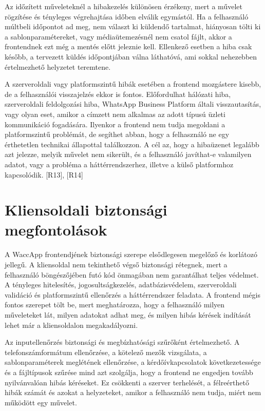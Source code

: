 Az időzített műveleteknél a hibakezelés különösen érzékeny, mert a művelet rögzítése és tényleges végrehajtása időben elválik egymástól. Ha a felhasználó múltbeli időpontot ad meg, nem választ ki küldendő tartalmat, hiányosan tölti ki a sablonparamétereket, vagy médiaütemezésnél nem csatol fájlt, akkor a frontendnek ezt még a mentés előtt jeleznie kell. Ellenkező esetben a hiba csak később, a tervezett küldés időpontjában válna láthatóvá, ami sokkal nehezebben értelmezhető helyzetet teremtene. 

A szerveroldali vagy platformszintű hibák esetében a frontend mozgástere kisebb, de a felhasználói visszajelzés ekkor is fontos. Előfordulhat hálózati hiba, szerveroldali feldolgozási hiba, WhatsApp Business Platform általi visszautasítás, vagy olyan eset, amikor a címzett nem alkalmas az adott típusú üzleti kommunikáció fogadására. Ilyenkor a frontend nem tudja megoldani a platformszintű problémát, de segíthet abban, hogy a felhasználó ne egy érthetetlen technikai állapottal találkozzon. A cél az, hogy a hibaüzenet legalább azt jelezze, melyik művelet nem sikerült, és a felhasználó javíthat-e valamilyen adatot, vagy a probléma a háttérrendszerhez, illetve a külső platformhoz kapcsolódik. [R13], [R14] 

\section{Kliensoldali biztonsági megfontolások}

A WaccApp frontendjének biztonsági szerepe elsődlegesen megelőző és korlátozó jellegű. A kliensoldal nem tekinthető végső biztonsági rétegnek, mert a felhasználó böngészőjében futó kód önmagában nem garantálhat teljes védelmet. A tényleges hitelesítés, jogosultságkezelés, adatbázisvédelem, szerveroldali validáció és platformszintű ellenőrzés a háttérrendszer feladata. A frontend mégis fontos szerepet tölt be, mert meghatározza, hogy a felhasználó milyen műveleteket lát, milyen adatokat adhat meg, és milyen hibás kérések indítását lehet már a kliensoldalon megakadályozni. 

Az inputellenőrzés biztonsági és megbízhatósági szűrőként értelmezhető. A telefonszámformátum ellenőrzése, a kötelező mezők vizsgálata, a sablonparaméterek meglétének ellenőrzése, a kérdőívkapcsolatok következetessége és a fájltípusok szűrése mind azt szolgálja, hogy a frontend ne engedjen tovább nyilvánvalóan hibás kéréseket. Ez csökkenti a szerver terhelését, a félreérthető hibák számát és azokat a helyzeteket, amikor a felhasználó nem tudja, miért nem működött egy művelet. 

